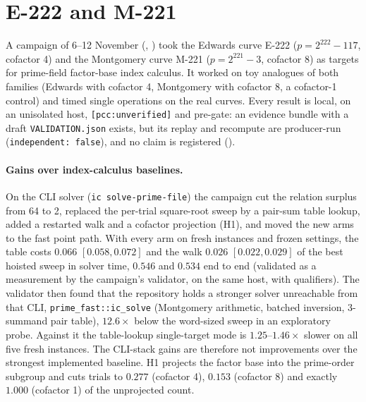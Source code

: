 \section{E-222 and M-221}\label{sec:pt-e222}

A campaign of 6--12 November (,
) took the
Edwards curve E-222 ($p=2^{222}-117$, cofactor 4) and the Montgomery curve
M-221 ($p=2^{221}-3$, cofactor 8) as targets for prime-field factor-base
index calculus. It worked on toy analogues of both families (Edwards with
cofactor 4, Montgomery with cofactor 8, a cofactor-1 control) and timed
single operations on the real curves. Every result is local, on an
unisolated host, \texttt{[pcc:unverified]} and pre-gate: an evidence bundle
with a draft \texttt{VALIDATION.json} exists, but its replay and recompute
are producer-run (\texttt{independent: false}), and no claim is registered
().

\paragraph{Gains over index-calculus baselines.} On the CLI solver
(\texttt{ic solve-prime-file}) the campaign cut the relation surplus from 64
to 2, replaced the per-trial square-root sweep by a pair-sum table lookup,
added a restarted walk and a cofactor projection (H1), and moved the new
arms to the fast point path. With every arm on fresh instances and frozen
settings, the table costs $0.066$ $[0.058,0.072]$ and the walk $0.026$
$[0.022,0.029]$ of the best hoisted sweep in solver time, $0.546$ and $0.534$
end to end (validated as a measurement by the campaign's validator, on the same host, with qualifiers). The validator then
found that the repository holds a stronger solver unreachable from that
CLI, \texttt{prime\_fast::ic\_solve} (Montgomery arithmetic, batched
inversion, 3-summand pair table), $12.6\times$ below the word-sized sweep in
an exploratory probe. Against it the table-lookup single-target mode is
$1.25$--$1.46\times$ slower on all five fresh instances. The CLI-stack gains
are therefore not improvements over the strongest implemented baseline.
H1 projects the factor base into the prime-order subgroup and cuts trials to
$0.277$ (cofactor 4), $0.153$ (cofactor 8) and exactly $1.000$ (cofactor 1)
of the unprojected count.

